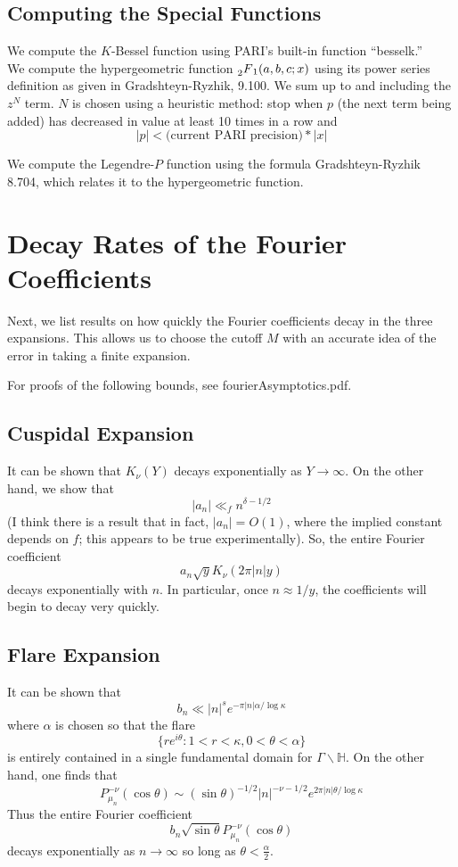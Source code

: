 \documentclass[]{article}
\begin{document}
\subsection*{Computing the Special Functions}

We compute the $K$-Bessel function using PARI's built-in function ``besselk.''
\\

We compute the hypergeometric function $\prescript{}{2}{F}_1(a, b, c; x)$ using its power series definition as given in Gradshteyn-Ryzhik, 9.100.
We sum up to and including the $z^N$ term.
$N$ is chosen using a heuristic method: stop when $p$ (the next term being added) has decreased in value at least 10 times in a row and
$$
|p| < \text{(current PARI precision)}*|x|
$$

We compute the Legendre-$P$ function using the formula Gradshteyn-Ryzhik 8.704, which relates it to the hypergeometric function.

\section*{Decay Rates of the Fourier Coefficients}

Next, we list results on how quickly the Fourier coefficients decay in the three expansions.
This allows us to choose the cutoff $M$ with an accurate idea of the error in taking a finite expansion.

For proofs of the following bounds, see fourierAsymptotics.pdf.

\subsection*{Cuspidal Expansion}

It can be shown that $K_\nu(Y)$ decays exponentially as $Y \rightarrow \infty$.
On the other hand, we show that
$$
|a_n| \ll_f n^{\delta-1/2}
$$
(I think there is a result that in fact, $|a_n| = O(1)$, where the implied constant depends on $f$; this appears to be true experimentally).
So, the entire Fourier coefficient
$$
a_n\sqrt{y}K_\nu(2\pi|n|y)
$$
decays exponentially with $n$.
In particular, once $n \approx 1/y$, the coefficients will begin to decay very quickly.

\subsection*{Flare Expansion}

It can be shown that
$$
b_n \ll |n|^se^{-\pi |n|\alpha/\log\kappa}
$$
where $\alpha$ is chosen so that the flare
$$
\{ re^{i\theta} : 1 < r < \kappa, 0 < \theta < \alpha \}
$$
is entirely contained in a single fundamental domain for $\Gamma\backslash\mathbb{H}$.
On the other hand, one finds that
$$
P_{\mu_n}^{-\nu}(\cos\theta) \sim (\sin\theta)^{-1/2}|n|^{-\nu-1/2}e^{2\pi|n|\theta/\log\kappa}
$$
Thus the entire Fourier coefficient
$$
b_n\sqrt{\sin\theta}P_{\mu_n}^{-\nu}(\cos\theta)
$$
decays exponentially as $n \rightarrow \infty$ so long as $\theta < \frac{\alpha}{2}$.
\\
\end{document}
